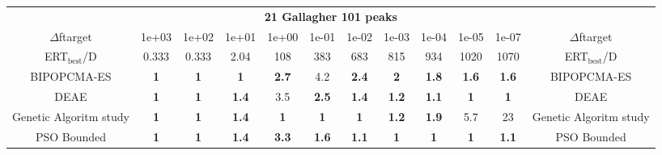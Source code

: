 \begin{tabular}{cccccccccccc}
 & \multicolumn{10}{c}{{\normalsize \textbf{21 Gallagher 101 peaks}}}\\
$\Delta$ftarget& 1e+03& 1e+02& 1e+01& 1e+00& 1e-01& 1e-02& 1e-03& 1e-04& 1e-05& 1e-07 & $\Delta$ftarget \\
ERT$_{\textrm{best}}$/D& 0.333& 0.333& 2.04& 108& 383& 683& 815& 934& 1020& 1070 & ERT$_{\textrm{best}}$/D \\
\hline
BIPOPCMA-ES & \textbf{1} & \textbf{1} & \textbf{1} & \textbf{2.7} & 4.2 & \textbf{2.4} & \textbf{2} & \textbf{1.8} & \textbf{1.6} & \textbf{1.6} & BIPOPCMA-ES \cite{add_an_entry_for_BIPOPCMA-ES_in_bbob.bib}\\
DEAE & \textbf{1} & \textbf{1} & \textbf{1.4} & 3.5 & \textbf{2.5} & \textbf{1.4} & \textbf{1.2} & \textbf{1.1} & \textbf{1} & \textbf{1} & DEAE \cite{add_an_entry_for_DEAE_in_bbob.bib}\\
Genetic Algoritm study & \textbf{1} & \textbf{1} & \textbf{1.4} & \textbf{1} & \textbf{1} & \textbf{1} & \textbf{1.2} & \textbf{1.9} & 5.7 & 23 & Genetic Algoritm study \cite{add_an_entry_for_Genetic Algoritm study_in_bbob.bib}\\
PSO Bounded & \textbf{1} & \textbf{1} & \textbf{1.4} & \textbf{3.3} & \textbf{1.6} & \textbf{1.1} & \textbf{1} & \textbf{1} & \textbf{1} & \textbf{1.1} & PSO Bounded \cite{add_an_entry_for_PSO Bounded_in_bbob.bib}
\end{tabular}
